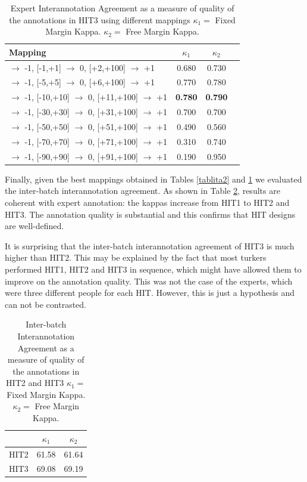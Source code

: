 \documentclass[11pt]{elsarticle}
\begin{document}
\begin{table}[h]
\begin{center}
\begin{tabular}{|l|c|c|c|}
\hline
Mapping & $\kappa_{1}$ & $\kappa_{2}$ \\
\hline
 [-100,-2] $\rightarrow$ -1, [-1,+1] $\rightarrow$ 0, [+2,+100] $\rightarrow$ +1& 0.680 & 0.730\\ \hline
 [-100,-6] $\rightarrow$ -1, [-5,+5] $\rightarrow$ 0, [+6,+100] $\rightarrow$ +1& 0.770 & 0.780\\ \hline
 [-100,-11] $\rightarrow$ -1, [-10,+10] $\rightarrow$ 0, [+11,+100] $\rightarrow$ +1& \textbf{0.780} & \textbf{0.790}\\ \hline
 [-100,-31] $\rightarrow$ -1, [-30,+30] $\rightarrow$ 0, [+31,+100] $\rightarrow$ +1& 0.700 & 0.700\\ \hline
 [-100,-51] $\rightarrow$ -1, [-50,+50] $\rightarrow$ 0, [+51,+100] $\rightarrow$ +1& 0.490 & 0.560\\ \hline
 [-100,-71] $\rightarrow$ -1, [-70,+70] $\rightarrow$ 0, [+71,+100] $\rightarrow$ +1& 0.310 & 0.740\\ \hline
[-100,-91] $\rightarrow$ -1, [-90,+90] $\rightarrow$ 0, [+91,+100] $\rightarrow$ +1& 0.190 & 0.950\\ \hline
\end{tabular}
\end{center}
\caption{Expert Interannotation Agreement as a measure of quality of the annotations in HIT3 using different mappings $\kappa_{1} = $ Fixed Margin Kappa. $\kappa_{2} = $ Free Margin Kappa.}
\label{tablita3}
\end{table}


Finally, given the best mappings obtained in Tables \ref{tablita2} and \ref{tablita3} we evaluated the inter-batch interannotation agreement. As shown in Table \ref{tablita4}, results are coherent with expert annotation: the kappas increase from HIT1 to HIT2 and HIT3. The annotation quality is substantial and this confirms that HIT designs are well-defined.

It is surprising that the inter-batch interannotation agreement
of HIT3 is much higher than HIT2. This may be explained by the fact that most turkers performed HIT1, HIT2 and HIT3 in sequence, which might have allowed them to improve on the annotation quality. This was not the case of the experts, which were three different people for each HIT. However, this is just a hypothesis and can not be contrasted.

\begin{table}[h]
\begin{center}
\begin{tabular}{|l|c|c|}
\hline
 & $\kappa_{1}$ & $\kappa_{2}$ \\
\hline
HIT2& 61.58 & 61.64\\ \hline
HIT3& 69.08 & 69.19\\ \hline
\end{tabular}
\end{center}
\caption{Inter-batch Interannotation Agreement as a measure of quality of the annotations in HIT2 and HIT3 $\kappa_{1} = $ Fixed Margin Kappa. $\kappa_{2} = $ Free Margin Kappa.}
\label{tablita4}
\end{table}
\end{document}
